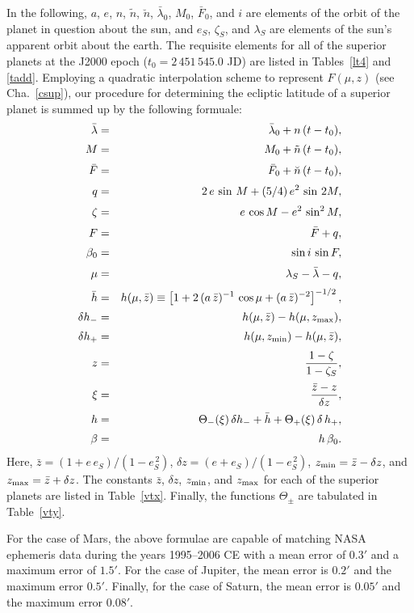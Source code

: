 In the following, $a$, $e$, $n$, $\tilde{n}$, $\breve{n}$, $\bar{\lambda}_0$, $M_0$,  $\bar{F}_0$, and $i$ are  elements of the orbit of the planet in question
about the sun, and $e_S$, $\zeta_S$, and $\lambda_S$  are elements of the sun's apparent orbit
about the earth. 
The requisite elements for all of the superior planets at the J2000 epoch ($t_0=2\,451\,545.0$ JD)
are listed in Tables~\ref{lt4} and \ref{tadd}.
Employing a quadratic interpolation scheme to represent
$F(\mu,z)$ (see Cha.~\ref{csup}), our procedure for determining the ecliptic latitude of a
superior planet is summed up by the following formuale:
\begin{eqnarray}
\bar{\lambda}&=&  \bar{\lambda}_0 + n\,(t-t_0) ,\\[0.5ex]
M &=& M_0  +\tilde{n}\,(t-t_0),\\[0.5ex]
\bar{F} &=& \bar{F}_0 + \breve{n}\,(t-t_0),\\[0.5ex]
q&=& 2\,e\,\sin \,M + (5/4)\,e^2\,\sin\,2M,\\[0.5ex]
\zeta &=& e\,\cos M - e^2\,\sin^2 M,\\[0.5ex]
F &=&\bar{F} + q,\\[0.5ex]
\beta_0  &=& \sin i\,\sin F,\\[0.5ex]
\mu&=& \lambda_S - \bar{\lambda}-q,\\[0.5ex]
\bar{h} &=& h(\mu,\bar{z})\equiv\left[1 + 2\,(a\,\bar{z})^{-1}\,\cos\mu+ (a\,\bar{z})^{-2}\right]^{-1/2},\\[0.5ex]
\delta h_- &=& h(\mu,\bar{z}) - h(\mu,z_{\rm max}),\\[0.5ex]
\delta h_+&=& h(\mu,z_{\rm min}) - h(\mu,\bar{z}),\\[0.5ex]
z &=& \frac{1-\zeta}{1-\zeta_S},\\[0.5ex]
\xi &=& \frac{\bar{z}-z}{\delta z},\\[0.5ex]
h  &=&\Theta_-(\xi)\,\delta h_-+ \bar{h}
+ \Theta_+(\xi)\,\delta\,h_+,\\[0.5ex]
\beta &=& h\,\beta_0.
\end{eqnarray}
Here, $\bar{z} = (1+e\,e_S)/(1-e_S^{\,2})$, $\delta z = (e+e_S)/(1-e_S^{\,2})$, $z_{\rm min} = \bar{z}-\delta z$,
and $z_{\rm max} = \bar{z}+\delta z$. The constants $\bar{z}$, $\delta z$, $z_{\rm min}$, and $z_{\rm max}$ 
for each of the superior planets are listed in Table~\ref{vtx}.  Finally, the functions $\Theta_\pm$ are  tabulated in Table~\ref{vty}.

For the case of Mars, the above formulae are capable of matching NASA ephemeris data during the years 1995--2006 CE
with a mean error of $0.3'$ and a maximum error of $1.5'$. For the case of Jupiter, the mean error is
$0.2'$ and the maximum error $0.5'$. Finally, for the case of Saturn, the mean error is $0.05'$ and the
maximum error $0.08'$. 

